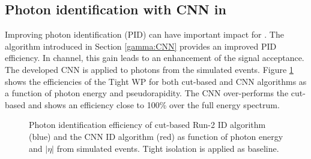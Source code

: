 \subsection{Photon identification with CNN in \HHyybb}
\label{HL-LHC:Run-3:CNN}

Improving photon identification (PID) can have important impact for \HHyybb. The algorithm introduced in Section \ref{gamma:CNN} provides an improved PID efficiency. In \HHyybb channel, this gain leads to an enhancement of the signal acceptance. The developed CNN is applied to photons from the \HHyybb simulated events.  Figure \ref{fig:HL-LHC:Run-3:CNN:E} shows the efficiencies of the Tight WP for both cut-based and CNN algorithms as a function of photon energy and pseudorapidity. The CNN over-performs the cut-based and shows an efficiency close to 100\% over the full energy spectrum.
\begin{figure}[htbp]
    \centering
    \begin{tcolorbox}[colback=black!5!white, colframe=white!75!black]
    \caption{Photon identification efficiency of cut-based Run-2 ID algorithm (blue) and the CNN ID algorithm (red) as function of photon energy and $|\eta|$ from \HHyybb simulated events. Tight isolation is applied as baseline.}
    \label{fig:HL-LHC:Run-3:CNN:E}
    \end{tcolorbox}
\end{figure}

